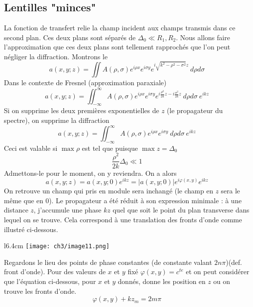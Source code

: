 	\subsection{Lentilles "minces"}
	La fonction de transfert relie la champ incident aux champs transmis dans ce second plan. Ces deux 
	plans sont séparés de $\Delta_0 \ll R_1,R_2$. Nous allons faire l'approximation que ces deux plans 
	sont tellement rapprochés que l'on peut négliger la diffraction. Montrons le 
	\begin{equation}
	a(x,y;z) = \iint A(\rho,\sigma) e^{i\rho x}e^{i\sigma y} e^{i\sqrt{k^2-\rho^2-\sigma^2}z}\ d\rho d\sigma
	\end{equation}
	Dans le contexte de Fresnel (approximation paraxiale)
	\begin{equation}
	a(x,y;z) = \iint_{-\infty}^\infty A(\rho,\sigma)e^{i\rho x}e^{i\sigma y} e^{i\frac{\rho^2}{2k}z
	-i\frac{\sigma^2}{2k}z}\ d\rho d\sigma\ e^{ikz}
	\end{equation}
	Si on supprime les deux premières exponentielles de $z$ (le propagateur du spectre), on supprime 
	la diffraction
	\begin{equation}
	a(x,y;z) = \iint_{-\infty}^\infty A(\rho,\sigma)e^{i\rho x}e^{i\sigma y}\ d\rho d\sigma\ e^{ikz}
	\end{equation}
	Ceci est valable si $\max\rho$ est tel que puisque $\max z = \Delta_0$
	\begin{equation}
	\frac{\rho^2}{2k}\Delta_0 \ll 1
	\end{equation}
	Admettons-le pour le moment, on y reviendra. On a alors
	\begin{equation}
	a(x,y;z) = a(x,y;0)e^{ikz} = |a(x,y;0)|e^{i\varphi(x,y)}e^{ikz}
	\label{eq:amod}
	\end{equation}
	On retrouve un champ qui pris en module sera inchangé (le champ en $z$ sera le même que en 0). Le 
	propagateur a été réduit à son expression minimale : à une distance $z$, j'accumule une phase $kz$ quel 
	que soit le point du plan transverse dans lequel on se trouve. Cela correspond à une translation des 
	fronts d'onde comme illustré ci-dessous.
	
	\newpage

	\begin{wrapfigure}[8]{l}{6.4cm}
	\vspace{-3mm}
	\texttt{[image: ch3/image11.png]}
	\end{wrapfigure}		
	Regardons le lieu des points de phase constantes (de constante valant $2n\pi$)(def. front d'onde).
	Pour des valeurs de $x$ et $y$ fixé $\varphi(x,y) = c^{te}$ et on peut considérer que 
	l'équation ci-dessous, pour $x$ et $y$ donnés, donne les position en $z$ ou on trouve les 
	fronts d'onde.
	\begin{equation}
	\varphi(x,y) + kz_m = 2m\pi
	\end{equation}

